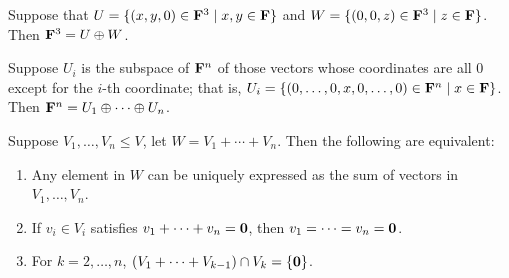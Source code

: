 \begin{example}
Suppose that $U=\{(x,y,0)\in\mathbf F^3\mid x,y\in\mathbf F\}$ and $W=\{(0,0,z)\in\mathbf F^3\mid z\in\mathbf F\}$. Then $\mathbf F^3=U\oplus W$.

Suppose $U_i$ is the subspace of $\mathbf F^n$ of those vectors whose coordinates are all 0 except for the $i$-th coordinate; that is, $U_i=\{(0,\dots,0,x,0,\dots,0)\in\mathbf F^n\mid x\in\mathbf F\}$. Then $\mathbf F^n=U_1\oplus\cdots\oplus U_n$.
\end{example}

\begin{lemma}\label{lemma:condition-direct-sum}
Suppose $V_1,\dots,V_n\le V$, let $W=V_1+\cdots+V_n$. Then the following are equivalent:
\begin{enumerate}[label=(\roman*)]
\item Any element in $W$ can be uniquely expressed as the sum of vectors in $V_1,\dots,V_n$.
\item If $v_i\in V_i$ satisfies $v_1+\cdots+v_n=\vb{0}$, then $v_1=\cdots=v_n=\vb{0}$.
\item For $k=2,\dots,n$, $(V_1+\cdots+V_{k-1})\cap V_k=\{\vb{0}\}$.
\end{enumerate}
\end{lemma}

